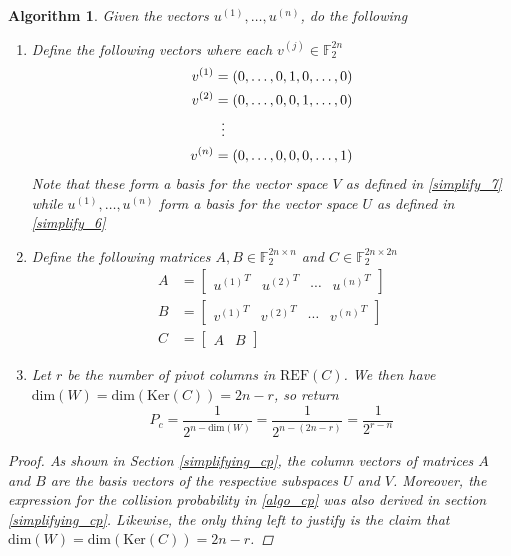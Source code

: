 \message{ !name(report_1.tex)}\documentclass[11pt]{article}
\newtheorem{algorithm}{Algorithm}
\theoremstyle{definition}
\theoremstyle{plain}
\begin{document}
\begin{algorithm}\label{algo_1}
  Given the vectors $u^{(1)}, \ldots, u^{(n)}$, do the following
  \begin{enumerate}[label = (\arabic*)]
  \item Define the following vectors where each $v^{(j)} \in \mathbb{F}_2^{2n}$ 
    \begin{align}
      v^{(1)} &= (0, \ldots, 0, 1, 0, \ldots, 0) \\
      v^{(2)} &= (0, \ldots, 0, 0, 1, \ldots, 0) \\
              & \vdotswithin{=} \nonumber \\
      v^{(n)} &= (0, \ldots, 0, 0, 0, \ldots, 1) 
    \end{align}
    Note that these form a basis for the vector space $V$ as defined in {\ref{simplify_7}} while $u^{(1)}, \ldots, u^{(n)}$ form a basis for the vector space $U$ as defined in {\ref{simplify_6}}
  \item Define the following matrices $A, B \in \mathbb{F}_2^{2n \times n}$ and $C \in \mathbb{F}_2^{2n \times 2n}$ 
    \begin{align}
      A &= \begin{bmatrix} {u^{(1)}}^T & {u^{(2)}}^T & \cdots & {u^{(n)}}^T
      \end{bmatrix} \\
      B &= \begin{bmatrix} {v^{(1)}}^T & {v^{(2)}}^T & \cdots & {v^{(n)}}^T
      \end{bmatrix} \\ 
      C &= \begin{bmatrix} A & B \end{bmatrix} 
    \end{align}
  \item\label{algo_step}
    Let $r$ be the number of pivot columns in $\text{REF}(C)$. We then have $\text{dim}(W) = \text{dim}(\text{Ker}(C)) = 2n - r$, so return
    \begin{equation}\label{algo_cp}
      P_c = \frac{1}{2^{n - \text{dim}(W)}}
      = \frac{1}{2^{n - (2n - r)}} = \frac{1}{2^{r-n}}
    \end{equation}
  \end{enumerate}
\begin{proof}
  As shown in Section {\ref{simplifying_cp}}, the column vectors of matrices $A$ and $B$ are the basis vectors of the respective subspaces $U$ and $V$. Moreover, the expression for the collision probability in {\ref{algo_cp}} was also derived in section {\ref{simplifying_cp}}. Likewise, the only thing left to justify is the claim that $\text{dim}(W) = \text{dim}(\text{Ker}(C)) = 2n - r$.
  

\end{proof}
\end{algorithm}
\end{document}
